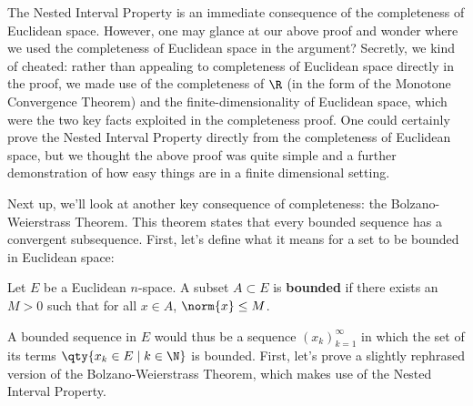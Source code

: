 The Nested Interval Property is an immediate consequence of the completeness of Euclidean space. However, one may glance at our above proof and wonder where we used the completeness of Euclidean space in the argument? Secretly, we kind of cheated: rather than appealing to completeness of Euclidean space directly in the proof, we made use of the completeness of \( \R \) (in the form of the Monotone Convergence Theorem) and the finite-dimensionality of Euclidean space, which were the two key facts exploited in the completeness proof. One could certainly prove the Nested Interval Property directly from the completeness of Euclidean space, but we thought the above proof was quite simple and a further demonstration of how easy things are in a finite dimensional setting.

\vspace{3mm}

Next up, we'll look at another key consequence of completeness: the Bolzano-Weierstrass Theorem. This theorem states that every bounded sequence has a convergent subsequence. First, let's define what it means for a set to be bounded in Euclidean space:

\begin{definition}
  Let \( E \) be a Euclidean \( n \)-space. A subset \( A\subset E \) is \textbf{bounded} if there exists an \( M>0 \) such that for all \( x\in A \), \( \norm{x}\leq M \).
\end{definition}

A bounded sequence in \( E \) would thus be a sequence \((x_k)_{k=1}^\infty  \) in which the set of its terms \( \qty{x_k\in E\mid k\in\N} \) is bounded. First, let's prove a slightly rephrased version of the Bolzano-Weierstrass Theorem, which makes use of the Nested Interval Property.

